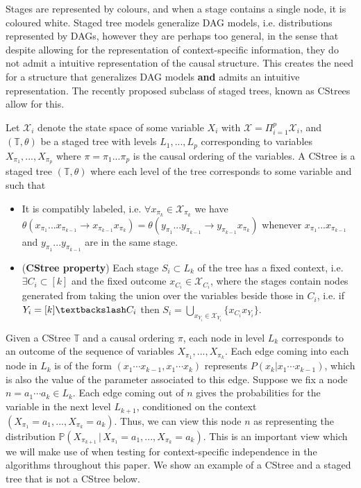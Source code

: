\documentclass{tufte-book}
\begin{document}
Stages are represented by colours, and when a stage contains a single node, it is coloured white. Staged tree models generalize DAG models, i.e. distributions represented by DAGs, however they are perhaps too general, in the sense that despite allowing for the representation of context-specific information, they do not admit a intuitive representation of the causal structure. This creates the need for a structure that generalizes DAG models \textbf{and} admits an intuitive representation. The recently proposed subclass of staged trees, known as CStrees allow for this.

\begin{definition}[CStrees]\label{def:cstree}
Let $\mathcal{X}_i$ denote the state space of some variable $X_i$ with $\mathcal{X} = \Pi_{i=1}^p \mathcal{X}_i$, and $(\mathbb{T},\theta)$ be a staged tree with levels $L_1,...,L_p$ corresponding to variables $X_{\pi_1},...,X_{\pi_p}$ where $\pi = \pi_1...\pi_p$ is the causal ordering of the variables.  
A CStree is a staged tree $(\mathbb{T}, \theta)$ where each level of the tree corresponds to some variable and  such that 
\begin{itemize}
\item It is compatibly labeled, i.e. $\forall x_{\pi_k} \in \mathcal{X}_{\pi_k}$ we have $\theta(x_{\pi_1}...x_{\pi_{k-1}}\rightarrow x_{\pi_{k-1}}x_{\pi_k}) = \theta(y_{\pi_1}...y_{\pi_{k-1}}\rightarrow y_{\pi_{k-1}}x_{\pi_k})$ whenever $x_{\pi_1}...x_{\pi_{k-1}}$ and $y_{\pi_1}...y_{\pi_{k-1}}$ are in the same stage.
\item (\textbf{CStree property}) Each stage $S_i \subset L_k$ of the tree has a fixed context, i.e. $\exists C_i \subset [k]$ and the fixed outcome $x_{C_i} \in \mathcal{X}_{C_i}$, where the stages contain nodes generated from taking the union over the variables beside those in $C_i$, i.e. if $Y_i = [k] \textbackslash C_i$ then $S_i = \bigcup_{x_{Y_i} \in \mathcal{X}_{Y_i}} \{x_{C_i}x_{Y_i} \}$.
\end{itemize}
\end{definition}



Given a CStree \(\mathbb{T}\) and a causal ordering \(\pi\), each node in level \(L_k\) corresponds to an outcome of the sequence of variables \(X_{\pi_1},...,X_{\pi_k}\). Each edge coming into each node in \(L_k\) is of the form \((x_1\cdots x_{k-1},x_1\cdots x_k)\) represents \(P(x_{k}|x_1 \cdots x_{k-1})\), which is also the value of the parameter associated to this edge. Suppose we fix a node \(n = a_1\cdots a_k \in L_k\). Each edge coming out of \(n\) gives the probabilities for the variable in the next level \(L_{k+1}\), conditioned on the context \((X_{\pi_1}=a_1,...,X_{\pi_k}=a_k)\). Thus, we can view this node \(n\) as representing the distribution \(\mathbb{P}(X_{\pi_{k+1}}\,|\, X_{\pi_1}=a_1,...,X_{\pi_k}=a_k)\). This is an important view which we will make use of when testing for context-specific independence in the algorithms throughout this paper. We show an example of a CStree and a staged tree that is not a CStree below.
\end{document}
